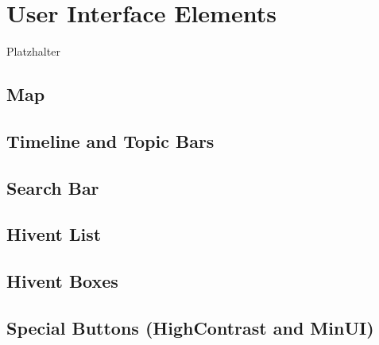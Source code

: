 \section{User Interface Elements}
Platzhalter\\
\subsection{Map}
\subsection{Timeline and Topic Bars}
\subsection{Search Bar}
\subsection{Hivent List}
\subsection{Hivent Boxes}
\subsection{Special Buttons (HighContrast and MinUI)}


\newpage